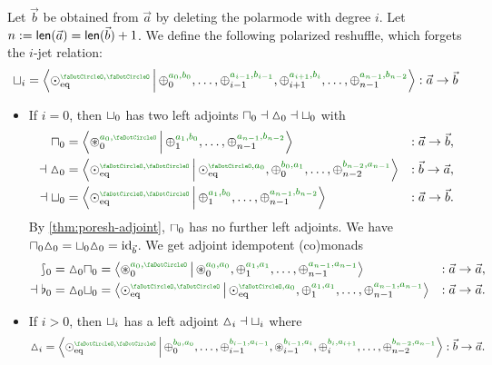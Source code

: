 \documentclass[a4paper]{memoir}
\begin{document}
\begin{example} \label{ex:cohesion}
	Let $\vec b$ be obtained from $\vec a$ by deleting the polarmode with degree $i$.
	Let $n := \mathsf{len}(\vec a) = \mathsf{len}(\vec b) + 1$.
	We define the following polarized reshuffle, which forgets the $i$-jet relation:
	\[
		\cohfget_i = \reshlist{\nonpol_\eqtydeg\pmrhom{\npolar}{\npolar}}{\pospol_0\pmrhom{a_0}{b_0}, \ldots, \pospol_{i-1}\pmrhom{a_{i-1}}{b_{i-1}}, \pospol_{i+1}\pmrhom{a_{i+1}}{b_{i}}, \ldots, \pospol_{n-1}\pmrhom{a_{n-1}}{b_{n-2}}} : \vec a \to \vec b
	\]
	\begin{itemize}
		\item If $i = 0$, then ${\sqcup}_0$ has two left adjoints ${\sqcap}_0 \dashv {\vartriangle}_0 \dashv {\sqcup}_0$ with
		\begin{align*}
			\cohpi_0 &= \reshlist{\isopol_0\pmrhom{a_0}{\npolar}}{\pospol_1\pmrhom{a_1}{b_0}, \ldots, \pospol_{n-1}\pmrhom{a_{n-1}}{b_{n-2}}} &: \vec a \to \vec b, \\
			\dashv
			\cohdisc_0 &= \reshlist{\nonpol_\eqtydeg\pmrhom{\npolar}{\npolar}}{\nonpol_\eqtydeg\pmrhom{\npolar}{a_0}, \pospol_0\pmrhom{b_0}{a_1}, \ldots, \pospol_{n-2}\pmrhom{b_{n-2}}{a_{n-1}}} &: \vec b \to \vec a, \\
			\dashv
			\cohfget_0 &= \reshlist{\nonpol_\eqtydeg\pmrhom{\npolar}{\npolar}}{\pospol_1\pmrhom{a_1}{b_0}, \ldots, \pospol_{n-1}\pmrhom{a_{n-1}}{b_{n-2}}} &: \vec a \to \vec b.
		\end{align*}
		By \cref{thm:poresh-adjoint}, ${\sqcap}_0$ has no further left adjoints.
		We have ${\sqcap}_0 {\vartriangle}_0 = {\sqcup}_0 {\vartriangle}_0 = \mathrm{id}_{\vec b}$. We get adjoint idempotent (co)monads
		\begin{align*}
			\shp_0 = \cohdisc_0 \cohpi_0 &= \reshlist{\isopol_0\pmrhom{a_0}{\npolar}}{\isopol_0\pmrhom{a_0}{a_0}, \pospol_1\pmrhom{a_1}{a_1}, \ldots, \pospol_{n-1}\pmrhom{a_{n-1}}{a_{n-1}}} &: \vec a \to \vec a, \\
			\dashv
			\flat_0 = \cohdisc_0 \cohfget_0 &= \reshlist{\nonpol_\eqtydeg\pmrhom{\npolar}{\npolar}}{\nonpol_\eqtydeg\pmrhom{\npolar}{a_0}, \pospol_1\pmrhom{a_1}{a_1}, \ldots, \pospol_{n-1}\pmrhom{a_{n-1}}{a_{n-1}}} &: \vec a \to \vec a.
		\end{align*}
		\item If $i > 0$, then ${\sqcup}_i$ has a left adjoint ${\vartriangle}_i \dashv {\sqcup}_i$ where
		\[
			\cohdisc_i = \reshlist{\nonpol_\eqtydeg\pmrhom{\npolar}{\npolar}}{\pospol_0\pmrhom{b_0}{a_0}, \ldots, \pospol_{i-1}\pmrhom{b_{i-1}}{a_{i-1}}, \isopol_{i-1}\pmrhom{b_{i-1}}{a_i}, \pospol_i\pmrhom{b_i}{a_{i+1}}, \ldots, \pospol_{n-2}\pmrhom{b_{n-2}}{a_{n-1}}} : \vec b \to \vec a.
\]
\end{itemize}
\end{example}
\end{document}
